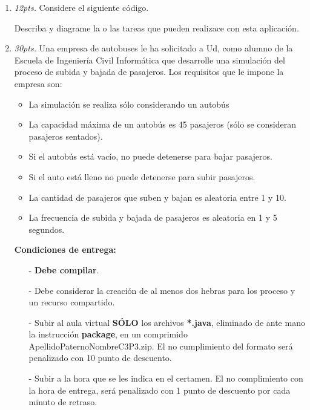 \documentclass[10pt]{article}
\begin{document}
{\begin{enumerate}
\begin{multicols}{2}
\end{multicols}

\newpage

\item \emph{12pts.} Considere el siguiente c\'odigo.

 

Describa y diagrame la o las tareas que pueden realizace con esta aplicaci\'on.

\newpage

\item \emph{30pts.} Una empresa de autobuses le ha solicitado a Ud, como alumno de la Escuela de Ingenier\'ia Civil Inform\'atica que desarrolle una simulaci\'on del proceso de subida y bajada de pasajeros. Los requisitos que le impone la empresa son:

\begin{itemize}
    \item La simulaci\'on se realiza s\'olo considerando un autobús
    \item La capacidad m\'axima de un autob\'us es 45 pasajeros (s\'olo se consideran pasajeros sentados).
    \item Si el autob\'us est\'a vac\'io, no puede detenerse para bajar pasajeros.
    \item Si el auto est\'a lleno no puede detenerse para subir pasajeros.
    \item La cantidad de pasajeros que suben y bajan es aleatoria entre 1 y 10.
    \item La frecuencia de subida y bajada de pasajeros es aleatoria en 1 y 5 segundos. 
\end{itemize}

\textbf{Condiciones de entrega:}
\begin{itemize}
    \item[-] \textbf{Debe compilar}. 
    \item[-] Debe considerar la creaci\'on de al menos dos hebras para los proceso y un recurso compartido. 
    \item[-] Subir al aula virtual \textbf{S\'OLO} los archivos \textbf{*.java}, eliminado de ante mano la instrucci\'on \textbf{package}, en un comprimido ApellidoPaternoNombreC3P3.zip. El no cumplimiento del formato ser\'a penalizado con 10 punto de descuento.
    \item[-] Subir a la hora que se les indica en el certamen. El no complimiento con la hora de entrega, ser\'a penalizado con 1 punto de descuento por cada minuto de retraso.
\end{itemize}


\end{enumerate}}
\end{document}
